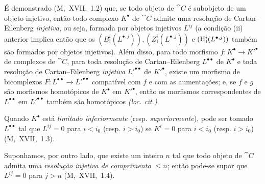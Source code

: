 \begin{env}[11.4.2]
É demonstrado (M,~XVII,~1.2) que, se todo objeto de $\cat{C}$ é subobjeto de um objeto injetivo, então todo complexo $K^\bullet$ de $\cat{C}$ admite uma resolução de Cartan--Eilenberg \emph{injetiva}, ou seja, formada por objetos injetivos $L^{ij}$ (a condição (ii) anterior implica então que os $(B_\mathrm{I}^i(L^{\bullet,j})), (Z_\mathrm{I}^i(L^{\bullet,j}))$ e $(\mathrm{H}_\mathrm{I}^i(L^{\bullet,j}))$ também são formados por objetos injetivos).
Além disso, para todo morfismo $f: K^\bullet \rightarrow K'^\bullet$ de complexos de $\cat{C}$,
para toda resolução de Cartan--Eilenberg $L^{\bullet\bullet}$ de $K^\bullet$ e toda resolução de Cartan--Eilenberg \emph{injetiva} $L'^{\bullet\bullet}$ de $K'^\bullet$, existe um morfismo de bicomplexos $F: L^{\bullet\bullet} \rightarrow L'^{\bullet\bullet}$ compatível com $f$ e com as aumentações; e, se $f$ e $g$ são morfismos homotópicos de $K^\bullet$ em $K'^\bullet$, então os morfismos correspondentes de $L^{\bullet\bullet}$ em $L'^{\bullet\bullet}$ também são homotópicos \emph{(loc. cit.)}.

Quando $K^{\bullet}$ está \emph{limitado inferiormente } (resp. \emph{superiormente}), pode ser tomado $L^{\bullet\bullet}$ tal que $L^{ij}=0$ para $i<i_0$ (resp. $i>i_0$) se $K^i=0$ para $i<i_0$ (resp. $i>i_0$) (M,~XVII,~1.3).

Suponhamos, por outro lado, que existe um inteiro $n$ tal que todo objeto de $\cat{C}$ admita uma \emph{resolução injetiva de comprimento $\leq n$};
então pode-se supor que $L^{ij}=0$ para $j>n$ (M,~XVII,~1.4).
\end{env}


